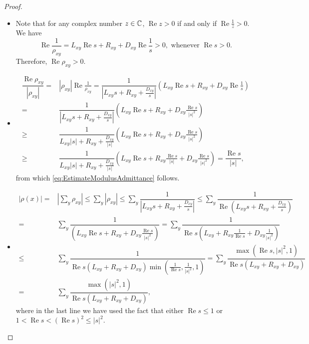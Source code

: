 \documentclass[a4paper,11pt]{amsart}
\theoremstyle{definition}
\renewcommand{\Re}{\operatorname{Re}}%
\begin{document}
\begin{proof}
\begin{itemize}
\item[1.]
Note that for any complex number $z\in \Bbb C$, $\Re z>0$ if and only if $\Re \frac{1}{z}>0$. We have
\begin{equation*}
\Re \frac{1}{\rho_{xy}}=L_{xy}\Re s+R_{xy}+D_{xy}\Re\frac{1}{s}>0, \mbox{ whenever }\Re s>0.
\end{equation*}
Therefore,  $\Re \rho_{xy} > 0$. 
\item[2.] 
\begin{align*}
\dfrac{\Re\rho_{xy}}{|\rho_{xy}|}=&|\rho_{xy}|\Re \frac{1}{\rho_{xy}}=\dfrac {1}{\left|L_{xy} s+R_{xy}+\frac{D_{xy}}{s}\right|}\left(L_{xy}\Re s+R_{xy}+D_{xy}\Re\frac{1}{s}\right)\\
=&\dfrac {1}{\left|L_{xy} s+R_{xy}+\frac{D_{xy}}{s}\right|}\left(L_{xy}\Re s+R_{xy}+D_{xy}\frac{\Re s}{|s|^2}\right)\\
\geq&\dfrac {1}{L_{xy} |s|+R_{xy}+\frac{D_{xy}}{|s|}}\left(L_{xy}\Re s+R_{xy}+D_{xy}\frac{\Re s}{|s|^2}\right)
\\
\geq&\dfrac {1}{L_{xy} |s|+R_{xy}+\frac{D_{xy}}{|s|}}\left(L_{xy}\Re s+R_{xy}\frac{\Re s}{|s|}+D_{xy}\frac{\Re s}{|s|^2}\right)=\dfrac{\Re s}{|s|},
\end{align*}
from which \eqref{eq:EstimateModulusAdmittance} follows.
\item[3.]
\begin{align*}
| \rho(x)| =&\left|\sum_y \rho_{xy}\right|\leq \sum_y |\rho_{xy}|\leq \sum_y \dfrac {1}{\left|L_{xy} s+R_{xy}+\frac{D_{xy}}{s}\right|}\leq \sum_y \dfrac {1}{\Re \left(L_{xy} s+R_{xy}+\frac{D_{xy}}{s}\right)}\\
=& \sum_y \dfrac {1}{ \left(L_{xy}\Re s+R_{xy}+D_{xy}\frac{\Re s}{|s|^2}\right)}=  \sum_y \dfrac {1}{ \Re s\left(L_{xy}+R_{xy}\frac{1}{\Re s}+D_{xy}\frac{1}{|s|^2}\right)}\\
\leq& \sum_y \dfrac {1}{ \Re s\left(L_{xy}+R_{xy}+D_{xy}\right)\min \left(\frac{1}{\Re s}, \frac{1}{|s|^2},1\right)}
= \sum_y \dfrac {\max \left({\Re s}, {|s|^2},1\right)}{ \Re s\left(L_{xy}+R_{xy}+D_{xy}\right)}\\
=& \sum_y \dfrac {\max \left({|s|^2},1\right)}{ \Re s\left(L_{xy}+R_{xy}+D_{xy}\right)},
\end{align*}
where in the last line we have used the fact that either $\Re s\le 1$ or $1<\Re s<(\Re s)^2\le |s|^2$.
\end{itemize}
\end{proof}
\end{document}
